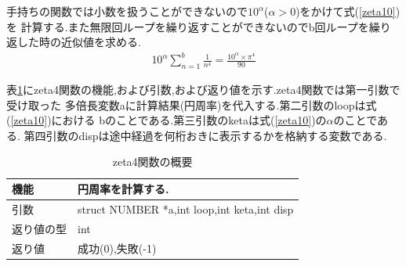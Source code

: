 \documentclass[a4j] {jarticle}
\begin{document}
手持ちの関数では小数を扱うことができないので$10^\alpha$($\alpha>0$)をかけて式(\ref{zeta10})を
計算する.また無限回ループを繰り返すことができないのでb回ループを繰り返した時の近似値を求める.
\begin{eqnarray}
  10^\alpha \sum_{n=1}^{b} \frac{1}{n^4} = \frac{10^\alpha \times \pi^4}{90}
  \label{zeta10}
\end{eqnarray}

表\ref{zeta4}にzeta4関数の機能,および引数,および返り値を示す.zeta4関数では第一引数で受け取った
多倍長変数aに計算結果(円周率)を代入する.第二引数のloopは式(\ref{zeta10})における
bのことである.第三引数のketaは式(\ref{zeta10})の$\alpha$のことである.
第四引数のdispは途中経過を何桁おきに表示するかを格納する変数である.
\begin{table}[H]
  \caption{zeta4関数の概要}
  \label{zeta4}
  \begin{center}
      \begin{tabular}{|l|l|}\hline
      機能 & 円周率を計算する.\\ \hline
      引数 & struct NUMBER *a,int loop,int keta,int disp\\ \hline
      返り値の型 & int\\ \hline
      返り値 & 成功(0),失敗(-1)\\ \hline
      \end{tabular}
  \end{center}
  \end{table}
\end{document}
